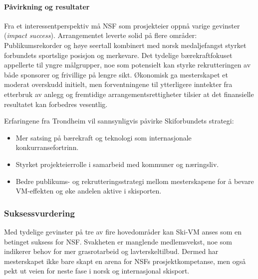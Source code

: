 \paragraph{Påvirkning og resultater}
Fra et interessentperspektiv må NSF som prosjekteier oppnå varige gevinster (\textit{impact success}). 
Arrangementet leverte solid på flere områder: Publikumsrekorder og høye seertall kombinert med norsk medaljefangst 
styrket forbundets sportslige posisjon og merkevare. Det tydelige bærekraftfokuset appellerte til yngre målgrupper, 
noe som potensielt kan styrke rekrutteringen av både sponsorer og frivillige på lengre sikt.
Økonomisk ga mesterskapet et moderat overskudd initielt, men forventningene til ytterligere inntekter 
fra etterbruk av anlegg og fremtidige arrangementsrettigheter tilsier at det finansielle resultatet 
kan forbedres vesentlig\cite{Trondheim2025Portal,Adresseavisen}.

Erfaringene fra Trondheim vil sannsynligvis påvirke Skiforbundets strategi:
\begin{itemize}
    \item Mer satsing på bærekraft og teknologi som internasjonale konkurransefortrinn.
    \item Styrket projekteierrolle i samarbeid med kommuner og næringsliv.
    \item Bedre publikums- og rekrutteringsstrategi mellom mesterskapene for å bevare VM-effekten og øke andelen aktive i skisporten.
\end{itemize}

\subsubsection{Suksessvurdering}
Med tydelige gevinster på tre av fire hovedområder kan Ski-VM anses som en betinget suksess for NSF.
Svakheten er manglende medlemsvekst, noe som indikerer behov for mer grasrotarbeid og lavterskeltilbud.
Dermed har mesterskapet ikke bare skapt en arena for NSFs prosjektkompetanse, men også pekt ut veien
for neste fase i norsk og internasjonal skisport.
